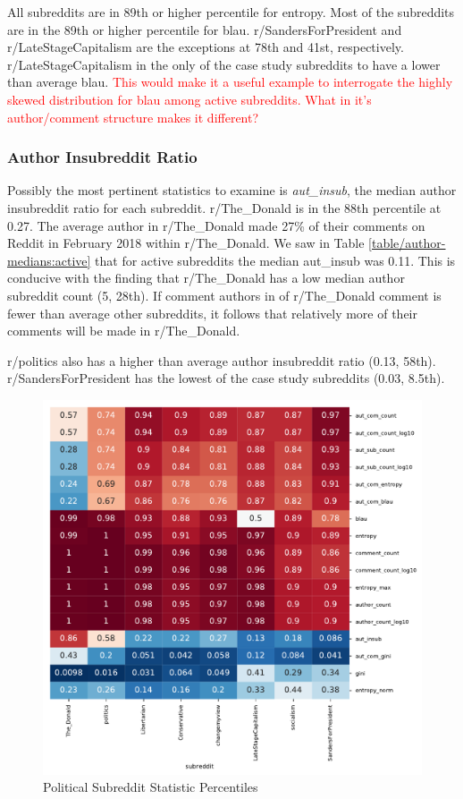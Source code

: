 All subreddits are in 89th or higher percentile for entropy. Most of the subreddits are in the 89th or higher percentile for blau. r/SandersForPresident and r/LateStageCapitalism are the exceptions at 78th and 41st, respectively. r/LateStageCapitalism in the only of the case study subreddits to have a lower than average blau. \textcolor{red}{This would make it a useful example to interrogate the highly skewed distribution for blau among active subreddits. What in it's author/comment structure makes it different?}


\subsubsection{Author Insubreddit Ratio}
Possibly the most pertinent statistics to examine is \textit{aut\_insub}, the median author insubreddit ratio for each subreddit. r/The\_Donald is in the 88th percentile at 0.27. The average author in r/The\_Donald made 27\% of their comments on Reddit in February 2018 within r/The\_Donald. We saw in Table \ref{table/author-medians:active} that for active subreddits the median aut\_insub was 0.11. This is conducive with the finding that r/The\_Donald has a low median author subreddit count (5, 28th). If comment authors in of r/The\_Donald comment is fewer than average other subreddits, it follows that relatively more of their comments will be made in r/The\_Donald.

r/politics also has a higher than average author insubreddit ratio (0.13, 58th). r/SandersForPresident has the lowest of the case study subreddits (0.03, 8.5th).


\begin{figure}
    \centering
    \includegraphics[scale=0.8]{latex/matrix/pol-cluster-active.pdf}
    \caption{Political Subreddit Statistic Percentiles}
    \label{pol-heatmap}
\end{figure}


\begin{landscape}

\end{landscape}